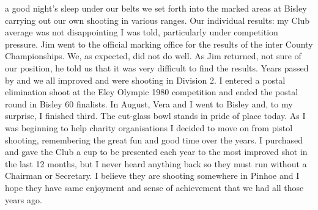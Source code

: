 a good night's sleep under our belts we set forth into the marked areas at
Bisley carrying out our own shooting in various ranges. Our individual results:
my Club average was not disappointing I was told, particularly under
competition pressure. Jim went to the official marking office for the results
of the inter County Championships. We, as expected, did not do well. As Jim
returned, not sure of our position, he told us that it was very difficult to
find the results. Years passed by and we all improved and were shooting in
Division 2. I entered a postal elimination shoot at the Eley Olympic 1980
competition and ended the postal round in Bisley 60 finalists. In August, Vera
and I went to Bisley and, to my surprise, I finished third. The cut-glass bowl
stands in pride of place today. As I was beginning to help charity
organisations I decided to move on from pistol shooting, remembering the great
fun and good time over the years. I purchased and gave the Club a cup to be
presented each year to the most improved shot in the last 12 months, but I
never heard anything back so they must run without a Chairman or Secretary. I
believe they are shooting somewhere in Pinhoe and I hope they have same
enjoyment and sense of achievement that we had all those years ago.